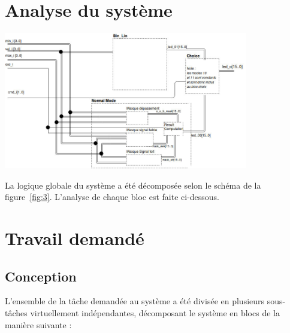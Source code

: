 \section{Analyse du système}

\begin{minipage}{\textwidth}
	\center
	\includegraphics[width = 0.8\textwidth]{figures/schema_bloc.jpg}
	\label{fig:3}
\end{minipage}

La logique globale du système a été décomposée selon le schéma de la figure~\ref{fig:3}. L'analyse de chaque bloc est faite ci-dessous.
\newpage

\section{Travail demandé}

\subsection{Conception}

L'ensemble de la tâche demandée au système a été divisée en plusieurs sous-tâches virtuellement indépendantes, décomposant le système en blocs de la manière suivante : 

